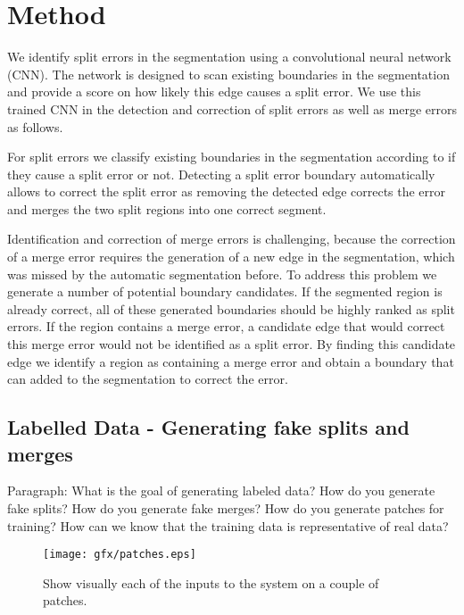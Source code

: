 \section{Method}
We identify split errors in the segmentation using a convolutional neural network (CNN). The network is designed to scan existing boundaries in the segmentation and provide a score on how likely this edge causes a split error. We use this trained CNN in the detection and correction of split errors as well as merge errors as follows.

For split errors we classify existing boundaries in the segmentation according to if they cause a split error or not. Detecting a split error boundary automatically allows to correct the split error as removing the detected edge corrects the error and merges the two split regions into one correct segment. 

Identification and correction of merge errors is challenging, because the correction of a merge error requires the generation of a new edge in the segmentation, which was missed by the automatic segmentation before. To address this problem we generate a number  of potential boundary candidates. If the segmented region is already correct, all of these generated boundaries should be highly ranked as split errors. If the region contains a merge error, a candidate edge that would correct this merge error would not be identified as a split error. By finding this candidate edge we identify a region as containing a merge error and obtain a boundary that can added to the segmentation to correct the error. 

\subsection{Labelled Data - Generating fake splits and merges}

Paragraph: What is the goal of generating labeled data? How do you generate fake splits? How do you generate fake merges? How do you generate patches for training? How can we know that the training data is representative of real data?

\begin{figure}[t]
\texttt{[image: gfx/patches.eps]}
\caption{Show visually each of the inputs to the system on a couple of patches.}
\end{figure}

